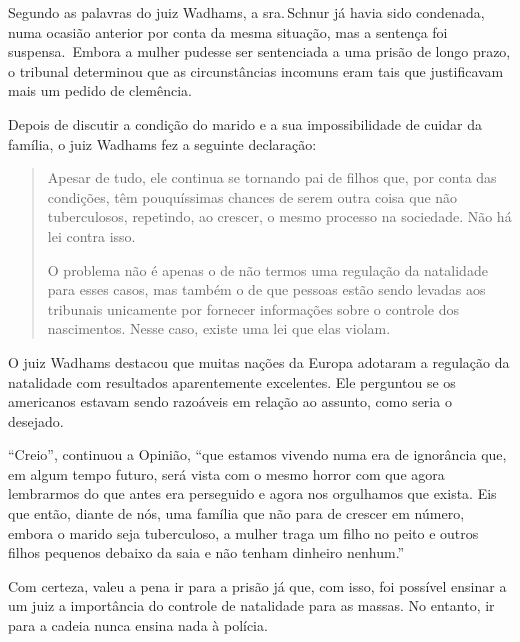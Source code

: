 Segundo as palavras do juiz Wadhams, a sra.\,Schnur já havia sido condenada,
numa ocasião anterior por conta da mesma situação, mas
a sentença foi suspensa.~Embora a mulher pudesse ser sentenciada a
uma prisão de longo prazo, o tribunal determinou que as circunstâncias
incomuns eram tais que justificavam mais um pedido de clemência.

Depois de discutir a condição do marido e a sua impossibilidade de cuidar
da família, o juiz Wadhams fez a seguinte declaração:

\begin{quote}
Apesar de tudo, ele continua se tornando pai de filhos que, por conta
das condições, têm pouquíssimas chances de serem outra coisa que não
tuberculosos, repetindo, ao crescer, o mesmo processo na sociedade. Não
há lei contra isso.

O problema não é apenas o de não termos uma regulação da natalidade
para esses casos, mas também o de que pessoas estão sendo levadas aos
tribunais unicamente por fornecer informações sobre o controle dos nascimentos.
Nesse caso, existe uma lei que elas violam.
\end{quote}

O juiz Wadhams destacou que muitas nações da Europa adotaram a regulação
da natalidade com resultados aparentemente excelentes. Ele perguntou se
os americanos estavam sendo razoáveis em relação ao assunto, como seria
o desejado.

``Creio'', continuou a Opinião, ``que estamos vivendo numa era de
ignorância que, em algum tempo futuro, será vista com o mesmo horror com
que agora lembrarmos do que antes era perseguido e agora nos orgulhamos
que exista. Eis que então, diante de nós, uma família que não para de
crescer em número, embora o marido seja tuberculoso, a mulher traga um
filho no peito e outros filhos pequenos debaixo da saia e não tenham
dinheiro nenhum.''

Com certeza, valeu a pena ir para a prisão já que, com isso, foi
possível ensinar a um juiz a importância do controle de natalidade para
as massas. No entanto, ir para a cadeia nunca ensina nada à polícia.

